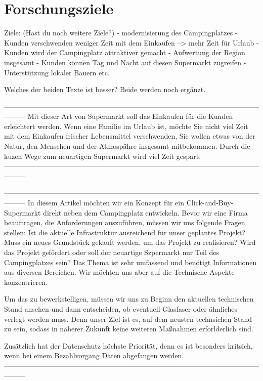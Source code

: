 \section{Forschungsziele}

Ziele: (Hast du noch weitere Ziele?)
- modernisierung des Campingplatzes
- Kunden verschwenden weniger Zeit mit dem Einkaufen --> mehr Zeit für Urlaub
- Kunden wird der Campingplatz attraktiver gemacht
- Aufwertung der Region insgesamt
- Kunden können Tag und Nacht auf diesen Supermarkt zugreifen
- Unterstützung lokaler Bauern etc.


Welches der beiden Texte ist besser? Beide werden noch ergänzt.

---------------------------------------------------------------------------------------------------------------------
Mit dieser Art von Supermarkt soll das Einkaufen für die Kunden erleichtert werden. 
Wenn eine Familie im Urlaub ist, möchte Sie nicht viel Zeit mit dem Einkaufen frischer Lebensmittel verschwenden, 
Sie wollen etwas von der Natur, den Menschen und der Atmospähre insgesamt mitbekommen.
Durch die kuzen Wege zum neuartigen Supermarkt wird viel Zeit gespart.
---------------------------------------------------------------------------------------------------------------------



---------------------------------------------------------------------------------------------------------------------
In diesem Artikel möchten wir ein Konzept für ein Click-and-Buy-Supermarkt direkt neben dem Campingplatz entwickeln.
Bevor wir eine Firma beauftragen, die Anforderungen auszuführen, müssen wir uns folgende Fragen stellen:
Ist die aktuelle Infrastruktur ausreichend für unser geplantes Projekt?
Muss ein neues Grundstück gekauft werden, um das Projekt zu realisieren?
Wird das Projekt gefördert oder soll der neuartige Szpermarkt nur Teil des Campingplatzes sein?
Das Thema ist sehr umfassend und benötigt Informationen aus diversen Bereichen.
Wir möchten uns aber auf die Technische Aspekte konzentrieren.


Um das zu bewerkstelligen, müssen wir uns zu Beginn den aktuellen technischen Stand ansehen und dann entscheiden, 
ob eventuell Glasfaser oder ähnliches verlegt werden muss. Denn unser Ziel ist es, auf dem neusten technsichen Stand zu sein, 
sodass in näherer Zukunft keine weiteren Maßnahmen erforlderlich sind.

Zusätzlich hat der Datenschutz höchste Priorität, denn es ist besonders kritsich, 
wenn bei einem Bezahlvorgang Daten abgefangen werden. 
---------------------------------------------------------------------------------------------------------------------